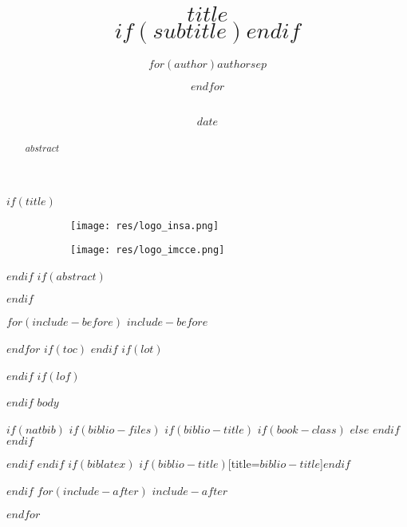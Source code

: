 \documentclass[$if(fontsize)$$fontsize$,$endif$$if(lang)$$lang$,$endif$$if(papersize)$$papersize$,$endif$$for(classoption)$$classoption$$sep$,$endfor$]{$documentclass$}
\title{ \HRule{0.5pt} \\ [0.5cm]
        \LARGE \textbf{\uppercase{$title$}}
        \HRule{0.5pt} \\ [0.5cm]
        \vspace*{2\baselineskip}
        \normalsize $if(subtitle)$\vspace{0.5em}{\large $subtitle$}$endif$}
\author{$for(author)$$author$$sep$ \and $endfor$ \\\vspace{0.5em}{\large $school$} \\\vspace{0.5em}{\large $dpt$}}
\date{$date$}
\makeatletter
\renewcommand*{\maketitle}{
\begin{titlepage}
    \begin{figure}[htbp]
        \begin{subfigure}[c]{\textwidth}
            \texttt{[image: res/logo\_insa.png]}
        \end{subfigure}
        \hfill
        \begin{subfigure}[c]{\textwidth}
            \texttt{[image: res/logo\_imcce.png]}
        \end{subfigure}
    \end{figure}
    \begin{center}
        \vspace{3cm}
        {\LARGE\@title\unskip\strut\par} \vspace{2cm}
        {\Large\@author\unskip\strut\par} \vspace{1.5cm}
        {\@date\unskip\strut\par}
    \end{center}
\end{titlepage}
}
\makeatother
\begin{document}
$if(title)$
\maketitle
$endif$
$if(abstract)$
\begin{abstract}
$abstract$
\end{abstract}
$endif$

$for(include-before)$
$include-before$

$endfor$
$if(toc)$
{
\hypersetup{linkcolor=black}
\setcounter{tocdepth}{$toc-depth$}
\tableofcontents
}
$endif$
$if(lot)$
\listoftables
$endif$
$if(lof)$
\listoffigures
$endif$
$body$

$if(natbib)$
$if(biblio-files)$
$if(biblio-title)$
$if(book-class)$
\renewcommand\bibname{$biblio-title$}
$else$
\renewcommand\refname{$biblio-title$}
$endif$
$endif$


$endif$
$endif$
$if(biblatex)$
\printbibliography$if(biblio-title)$[title=$biblio-title$]$endif$

$endif$
$for(include-after)$
$include-after$

$endfor$
\end{document}
